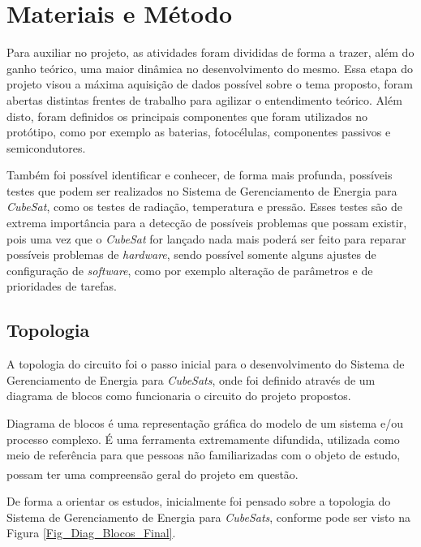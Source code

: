 \documentclass[
	12pt,				%
	openright,			%
	oneside,			%
	a4paper,			%
	english,			%
	french,				%
	spanish,			%
	brazil,				%
	oldfontcommands
	]{abntex2}
\begin{document}
\chapter[Materiais e Método]{Materiais e Método}

	Para auxiliar no projeto, as atividades foram divididas de forma a trazer, além do ganho teórico, uma maior dinâmica no desenvolvimento do mesmo. Essa etapa do projeto visou a máxima aquisição de dados possível sobre o tema proposto, foram abertas distintas frentes de trabalho para agilizar o entendimento teórico. Além disto, foram definidos os principais componentes que foram utilizados no protótipo, como por exemplo as baterias, fotocélulas, componentes passivos e semicondutores.
	
	Também foi possível identificar e conhecer, de forma mais profunda, possíveis testes que podem ser realizados no Sistema de Gerenciamento de Energia para \textit{CubeSat}, como os testes de radiação, temperatura e pressão. Esses testes são de extrema importância para a detecção de possíveis problemas que possam existir, pois uma vez que o \textit{CubeSat} for lançado nada mais poderá ser feito para reparar possíveis problemas de \textit{hardware}, sendo possível somente alguns ajustes de configuração de \textit{software}, como por exemplo alteração de parâmetros e de prioridades de tarefas.
	
\section[Topologia]{Topologia}

	A topologia do circuito foi o passo inicial para o desenvolvimento do Sistema de Gerenciamento de Energia para \textit{CubeSats}, onde foi definido através de um diagrama de blocos como funcionaria o circuito do projeto propostos.
	
	Diagrama de blocos é uma representação gráfica do modelo de um sistema e/ou processo complexo. É uma ferramenta extremamente difundida, utilizada como meio de referência para que pessoas não familiarizadas com o objeto de estudo, possam ter uma compreensão geral do projeto em questão.\textsuperscript{\cite{Diag_Blocos}}	
		
	De forma a orientar os estudos, inicialmente foi pensado sobre a topologia do Sistema de Gerenciamento de Energia para \textit{CubeSats}, conforme pode ser visto na Figura \ref{Fig_Diag_Blocos_Final}. 
\end{document}
